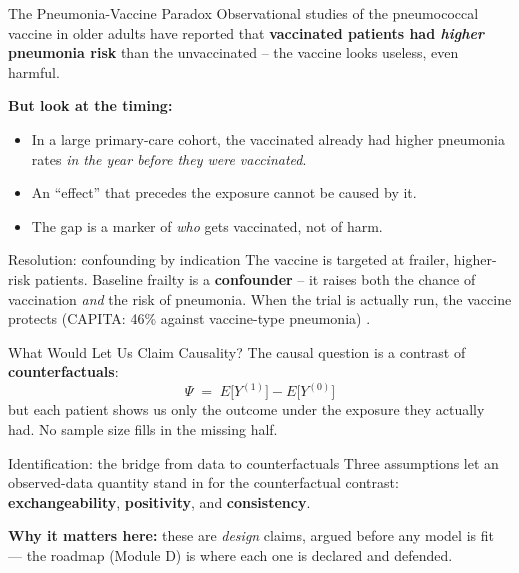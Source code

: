 \documentclass[aspectratio=169]{beamer}
\begin{document}
\begin{frame}{The Pneumonia-Vaccine Paradox}
  \small
  Observational studies of the pneumococcal vaccine in older adults have
  reported that \textbf{vaccinated patients had \emph{higher} pneumonia risk}
  than the unvaccinated -- the vaccine looks useless, even harmful.
  \vspace{0.5em}

  \textbf{But look at the timing:}
  \begin{itemize}
    \item In a large primary-care cohort, the vaccinated already had higher
      pneumonia rates \emph{in the year before they were vaccinated}.
    \item An ``effect'' that precedes the exposure cannot be caused by it.
    \item The gap is a marker of \emph{who} gets vaccinated, not of harm.
  \end{itemize}
  \vspace{0.5em}

  \begin{block}{Resolution: confounding by indication}
    The vaccine is targeted at frailer, higher-risk patients. Baseline
    frailty is a \textbf{confounder} -- it raises both the chance of
    vaccination \emph{and} the risk of pneumonia. When the trial is actually
    run, the vaccine protects (CAPITA: 46\% against vaccine-type pneumonia)
    \cite{bonten2015capita}.
  \end{block}
\end{frame}


\begin{frame}{What Would Let Us Claim Causality?}
  \small
  The causal question is a contrast of \textbf{counterfactuals}:
  \[
    \Psi \;=\; E\big[Y^{(1)}\big] - E\big[Y^{(0)}\big]
  \]
  but each patient shows us only the outcome under the exposure they
  actually had. No sample size fills in the missing half.
  \vspace{0.5em}

  \begin{block}{Identification: the bridge from data to counterfactuals}
    Three assumptions let an observed-data quantity stand in for the
    counterfactual contrast: \textbf{exchangeability},
    \textbf{positivity}, and \textbf{consistency}.
  \end{block}
  \vspace{0.4em}

  \textcolor{accent}{\textbf{Why it matters here:}} these are
  \emph{design} claims, argued before any model is fit --- the roadmap
  (Module D) is where each one is declared and defended.
\end{frame}
\end{document}
